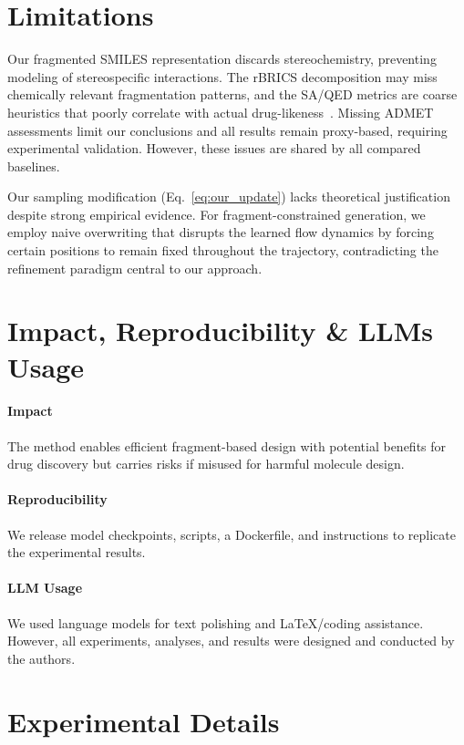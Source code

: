 \documentclass{article} %
\begin{document}
\section{Limitations}
Our fragmented SMILES representation discards stereochemistry, preventing modeling of stereospecific interactions. The rBRICS decomposition may miss chemically relevant fragmentation patterns, and the SA/QED metrics are coarse heuristics that poorly correlate with actual drug-likeness~\citep{sa1, sa2}. Missing ADMET assessments limit our conclusions and all results remain proxy-based, requiring experimental validation. However, these issues are shared by all compared baselines.

Our sampling modification (Eq.~\ref{eq:our_update}) lacks theoretical justification despite strong empirical evidence. For fragment-constrained generation, we employ naive overwriting that disrupts the learned flow dynamics by forcing certain positions to remain fixed throughout the trajectory, contradicting the refinement paradigm central to our approach.
\section{Impact, Reproducibility \& LLMs Usage}

\paragraph{Impact}
The method enables efficient fragment-based design with potential benefits for drug discovery but carries risks if misused for harmful molecule design.
\paragraph{Reproducibility}
We release model checkpoints, scripts, a Dockerfile, and instructions to replicate the experimental results.
\paragraph{LLM Usage}
We used language models for text polishing and LaTeX/coding assistance.
However, all experiments, analyses, and results were designed and conducted by the authors.

\clearpage



\clearpage
\appendix
\section{Experimental Details}
\end{document}
